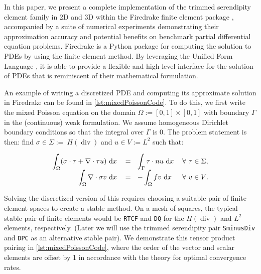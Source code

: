 \documentclass[format=acmsmall,screen,timestamp=false,a4paper]{acmart}
\DeclareMathOperator{\Div}{div}
\newcommand\akg[1]{\textbf{\textcolor[rgb]{.5,0,1}{[Andrew: #1]}}}
\newcommand\lm[1]{\textbf{\textcolor[rgb]{1,0,0.5}{[Lawrence: #1]}}}
\newcommand{\hdiv}{\ensuremath{{H}(\Div ) } }
\begin{document}
In this paper, we present a complete implementation of the trimmed serendipity element family in 2D and 3D within the Firedrake finite element package \cite{rathgeber2016firedrake}, accompanied by a suite of numerical experiments demonstrating their approximation accuracy and potential benefits on benchmark partial differential equation problems.
Firedrake is a Python package for computing the solution to PDEs by using the finite element method.  By leveraging the Unified Form Language \cite{Logg:2012,alnaes2014unified}, it is able to provide a flexible and high level interface for the solution of PDEs that is reminiscent of their mathematical formulation.


An example of writing a discretized PDE and computing its approximate solution in Firedrake can be found in \cref{lst:mixedPoissonCode}. To do this, we first write the mixed Poisson equation on the domain $\Omega := [0, 1] \times [0,1]$ with boundary $\Gamma$ in the (continuous) weak formulation.  We assume homogeneous Dirichlet boundary conditions so that the integral over $\Gamma$ is $0$.  The problem statement is then:
find $\sigma \in \Sigma :=~$\hdiv and $u \in V := L^2$ such that:%

\begin{equation}\label{eq:MixedPoisson}
\begin{tabular}{rllll}

$\displaystyle\int_\Omega (\sigma \cdot \tau + \nabla\cdot\tau u) \text{ d}x$ & $=~~\displaystyle \int_\Gamma \tau \cdot n u \text{ d}x$ & $\forall~ \tau\in\Sigma$, \\
$\displaystyle\int_\Omega \nabla \cdot \sigma v \text{ d}x$ & $= ~~\displaystyle -\int_\Omega fv \text{ d}x$ & $\forall~ v\in V$.
\end{tabular}
\end{equation}

Solving the discretized version of this requires choosing a suitable pair of finite element spaces to create a stable method.  On a mesh of squares, the typical stable pair of finite elements would be \texttt{RTCF} and \texttt{DQ} for the \hdiv and $L^2$ elements, respectively.  (Later we will use the trimmed serendipity pair \texttt{SminusDiv} and \texttt{DPC} as an alternative stable pair).  We demonstrate this tensor product pairing in \cref{lst:mixedPoissonCode}, where the order of the vector and scalar elements are offset by 1 in accordance with the theory for optimal convergence rates.
\end{document}
